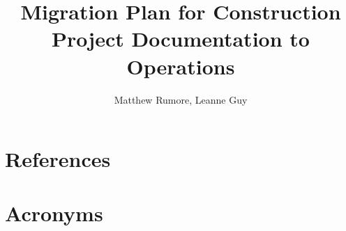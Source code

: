 \documentclass[OPS,authoryear,lsstdraft,toc]{lsstdoc}
\title{Migration Plan for Construction Project Documentation to Operations}
\author{%
Matthew Rumore, Leanne Guy
}
\date{\vcsDate}
\begin{document}
\maketitle



\appendix

% 

\section{References} \label{sec:bib}
\renewcommand{\refname}{} %


\section{Acronyms} \label{sec:acronyms}

\end{document}
